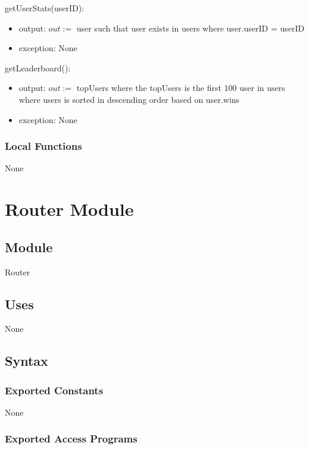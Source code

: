 \documentclass[12pt, titlepage]{article}
\begin{document}
\noindent getUserStats(userID):
\begin{itemize}
\item output: $out :=$ user such that user exists in users where user.userID = userID
\item exception: None
\end{itemize}

\noindent getLeaderboard():
\begin{itemize}
\item output: $out := $ topUsers where the topUsers is the first 100 user in users where users is sorted in descending order based on user.wins 
\item exception: None
\end{itemize}


\subsubsection{Local Functions}

None

\newpage

\section{Router Module} \label{Router}

\subsection{Module}

Router

\subsection{Uses}

None

\subsection{Syntax}

\subsubsection{Exported Constants}

None

\subsubsection{Exported Access Programs}
\end{document}
